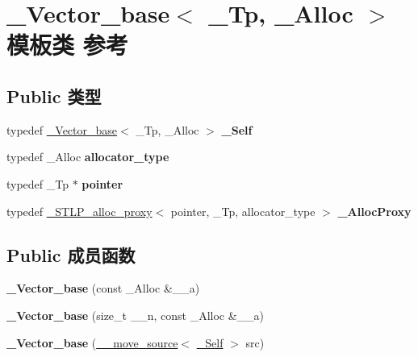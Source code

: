 \hypertarget{class___vector__base}{}\section{\+\_\+\+Vector\+\_\+base$<$ \+\_\+\+Tp, \+\_\+\+Alloc $>$ 模板类 参考}
\label{class___vector__base}
\subsection*{Public 类型}
\begin{DoxyCompactItemize}
\item 
\mbox{\label{class___vector__base_a2ad1c17ed60902a1a2924d7d084f0200}} 
typedef \hyperlink{class___vector__base}{\+\_\+\+Vector\+\_\+base}$<$ \+\_\+\+Tp, \+\_\+\+Alloc $>$ {\bfseries \+\_\+\+Self}
\item 
\mbox{\label{class___vector__base_a9dec6324d4c5061853fb95f8ff0b5459}} 
typedef \+\_\+\+Alloc {\bfseries allocator\+\_\+type}
\item 
\mbox{\label{class___vector__base_a37a400ea08f83d679016e699c4b97aef}} 
typedef \+\_\+\+Tp $\ast$ {\bfseries pointer}
\item 
\mbox{\label{class___vector__base_ae717ed668ce2232d881344754bce21d5}} 
typedef \hyperlink{class___s_t_l_p__alloc__proxy}{\+\_\+\+S\+T\+L\+P\+\_\+alloc\+\_\+proxy}$<$ pointer, \+\_\+\+Tp, allocator\+\_\+type $>$ {\bfseries \+\_\+\+Alloc\+Proxy}
\end{DoxyCompactItemize}
\subsection*{Public 成员函数}
\begin{DoxyCompactItemize}
\item 
\mbox{\label{class___vector__base_a0365090034b76cd460f58620e84e7d49}} 
{\bfseries \+\_\+\+Vector\+\_\+base} (const \+\_\+\+Alloc \&\+\_\+\+\_\+a)
\item 
\mbox{\label{class___vector__base_a7ce6108202290bb4d8e2d81bd6ee6447}} 
{\bfseries \+\_\+\+Vector\+\_\+base} (size\+\_\+t \+\_\+\+\_\+n, const \+\_\+\+Alloc \&\+\_\+\+\_\+a)
\item 
\mbox{\label{class___vector__base_a85e306f1c0c098493da06c6d9758f494}} 
{\bfseries \+\_\+\+Vector\+\_\+base} (\hyperlink{class____move__source}{\+\_\+\+\_\+move\+\_\+source}$<$ \hyperlink{class___vector__base}{\+\_\+\+Self} $>$ src)
\end{DoxyCompactItemize}
